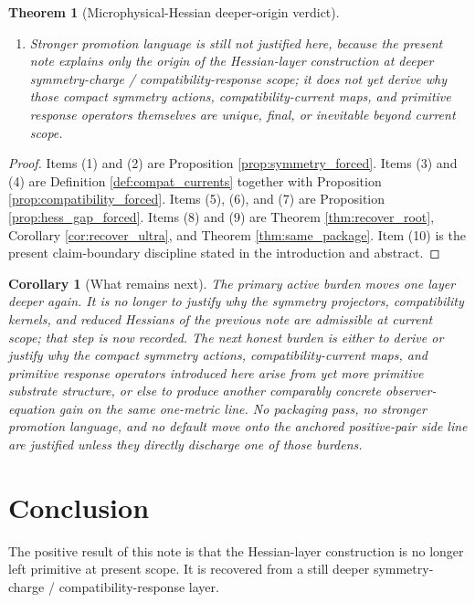 \documentclass[11pt]{article}
\newtheorem{corollary}{Corollary}
\newtheorem{theorem}{Theorem}
\begin{document}
\begin{theorem}[Microphysical-Hessian deeper-origin verdict]
\begin{enumerate}
    \item Stronger promotion language is still not justified here, because the present note explains only the origin of the Hessian-layer construction at deeper symmetry-charge / compatibility-response scope; it does not yet derive why those compact symmetry actions, compatibility-current maps, and primitive response operators themselves are unique, final, or inevitable beyond current scope.
\end{enumerate}
\end{theorem}

\begin{proof}
Items (1) and (2) are Proposition \ref{prop:symmetry_forced}. Items (3) and (4) are Definition \ref{def:compat_currents} together with Proposition \ref{prop:compatibility_forced}. Items (5), (6), and (7) are Proposition \ref{prop:hess_gap_forced}. Items (8) and (9) are Theorem \ref{thm:recover_root}, Corollary \ref{cor:recover_ultra}, and Theorem \ref{thm:same_package}. Item (10) is the present claim-boundary discipline stated in the introduction and abstract.
\end{proof}

\begin{corollary}[What remains next]
\label{cor:what_next}
The primary active burden moves one layer deeper again. It is no longer to justify why the symmetry projectors, compatibility kernels, and reduced Hessians of the previous note are admissible at current scope; that step is now recorded. The next honest burden is either to derive or justify why the compact symmetry actions, compatibility-current maps, and primitive response operators introduced here arise from yet more primitive substrate structure, or else to produce another comparably concrete observer-equation gain on the same one-metric line. No packaging pass, no stronger promotion language, and no default move onto the anchored positive-pair side line are justified unless they directly discharge one of those burdens.
\end{corollary}

\section{Conclusion}

The positive result of this note is that the Hessian-layer construction is no longer left primitive at present scope. It is recovered from a still deeper symmetry-charge / compatibility-response layer.
\end{document}
